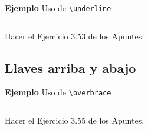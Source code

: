 \documentclass[11pt,a4paper]{report}
\begin{document}
\bigskip
\textbf{Ejemplo} Uso de \texttt{\textbackslash{}underline}

\begin{equation*}
\end{equation*}

\bigskip





\bigskip
 Hacer el Ejercicio 3.53 de los Apuntes.



\bigskip





\subsection{Llaves arriba y abajo}





\bigskip
\textbf{Ejemplo} Uso de \texttt{\textbackslash{}overbrace}

\begin{equation*}
\end{equation*}

\bigskip





\bigskip
 Hacer el Ejercicio 3.55 de los Apuntes.



\bigskip





\end{document}
